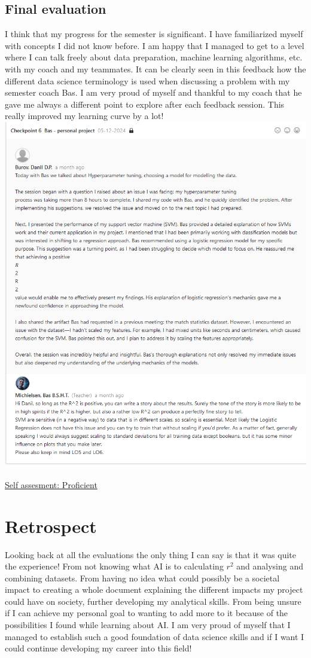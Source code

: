 \documentclass{article}
\begin{document}
\subsection{Final evaluation}
I think that my progress for the semester is significant. I have familiarized myself with concepts I did not know before. I am happy that I managed to get to a level where I can talk freely about data preparation, machine learning algorithms, etc. with my coach and my teammates. It can be clearly seen in this feedback how the different data science terminology is used when discussing a problem with my semester coach Bas. I am very proud of myself and thankful to my coach that he gave me always a different point to explore after each feedback session. This really improved my learning curve by a lot!\\
\includegraphics[width=\textwidth,keepaspectratio]{images/Feedback_Bas_2.png}\\\\
\underline{Self assesment: Proficient}

\section{Retrospect} %
Looking back at all the evaluations the only thing I can say is that it was quite the experience! From not knowing what AI is to calculating $r^2$ and analysing and combining datasets. From having no idea what could possibly be a societal impact to creating a whole document explaining the different impacts my project could have on society, further developing my analytical skills. From being unsure if I can achieve my personal goal to wanting to add more to it because of the possibilities I found while learning about AI. I am very proud of myself that I managed to establish such a good foundation of data science skills and if I want I could continue developing my career into this field!
\end{document}
